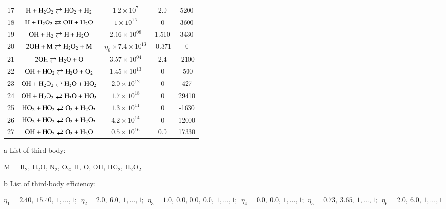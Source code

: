 \documentclass{warpdoc}
\begin{document}
\begin{table}[ht]
\begin{center}
\begin{threeparttable}
\begin{tabular}{ccccc}
    17 & $\rm H + H_2O_2 \rightleftarrows  HO_2 + H_2$  & $ 1.2 \times 10^{7} $& 2.0 & 5200 \\
    18 & $\rm H + H_2O_2 \rightleftarrows  OH + H_2O$  & $ 1 \times 10^{13} $& 0 & 3600 \\
    19 & $\rm OH + H_2 \rightleftarrows  H + H_2O$  & $ 2.16 \times 10^{08} $& 1.510 & 3430 \\
    20 & $\rm 2OH + M \rightleftarrows  H_2O_2 + M$  & $ \eta_6 \times 7.4 \times 10^{13} $& -0.371 & 0 \\
    21 & $\rm 2OH \rightleftarrows  H_2O + O$  & $ 3.57 \times 10^{04} $& 2.4 & -2100 \\
    22 & $\rm OH + HO_2 \rightleftarrows  H_2O + O_2$  & $ 1.45 \times 10^{13} $& 0 & -500 \\
    23 & $\rm OH + H_2O_2 \rightleftarrows  H_2O + HO_2$  & $ 2.0 \times 10^{12} $& 0 & 427 \\
    24 & $\rm OH + H_2O_2 \rightleftarrows  H_2O + HO_2$  & $ 1.7 \times 10^{18} $& 0 & 29410  \\
    25 & $\rm HO_2 + HO_2 \rightleftarrows  O_2 + H_2O_2$  & $ 1.3 \times 10^{11} $& 0 & -1630  \\
    26 & $\rm HO_2 + HO_2 \rightleftarrows  O_2 + H_2O_2$  & $ 4.2 \times 10^{14} $& 0 & 12000  \\
    27 & $\rm OH + HO_2 \rightleftarrows  O_2 + H_2O$  & $ 0.5 \times 10^{16} $& 0.0 & 17330  \\
\bottomrule
\end{tabular}
\label{tab:GRI-Mech-Reaction}
\begin{tablenotes}
\item[{a}] List of third-body: 
\item M = H$_2$, H$_2$O, N$_2$, O$_2$, H, O, OH, HO$_2$, H$_2$O$_2$
\item[{b}] List of third-body efficiency: 
\item $\eta_1 = 2.40,~ 15.40,~1,...,1;~~  \eta_2 = 2.0,~ 6.0,~1,...,1;~~ \eta_3 = 1.0,~ 0.0,~ 0.0,~ 0.0,~1,...,1;~~ \eta_4 = 0.0,~ 0.0,~1,...,1;~~ \eta_5 = 0.73,~ 3.65,~1,...,1;~~ \eta_6 = 2.0,~ 6.0,~1,...,1$
\end{tablenotes}
\end{threeparttable}
\end{center}
\end{table}
%

\clearpage 
\end{document}
